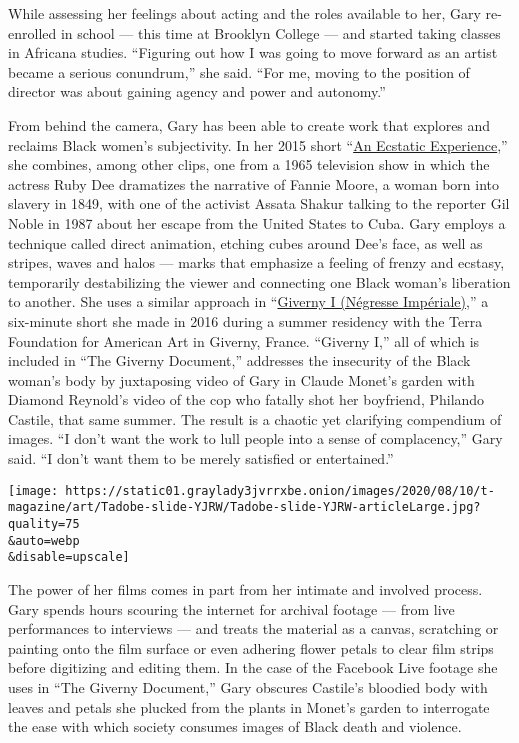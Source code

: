 While assessing her feelings about acting and the roles available to
her, Gary re-enrolled in school --- this time at Brooklyn College ---
and started taking classes in Africana studies. ``Figuring out how I was
going to move forward as an artist became a serious conundrum,'' she
said. ``For me, moving to the position of director was about gaining
agency and power and autonomy.''

From behind the camera, Gary has been able to create work that explores
and reclaims Black women's subjectivity. In her 2015 short
``\href{https://www.jatovia.com/gallery-3\#1}{An Ecstatic Experience},''
she combines, among other clips, one from a 1965 television show in
which the actress Ruby Dee dramatizes the narrative of Fannie Moore, a
woman born into slavery in 1849, with one of the activist Assata Shakur
talking to the reporter Gil Noble in 1987 about her escape from the
United States to Cuba. Gary employs a technique called direct animation,
etching cubes around Dee's face, as well as stripes, waves and halos ---
marks that emphasize a feeling of frenzy and ecstasy, temporarily
destabilizing the viewer and connecting one Black woman's liberation to
another. She uses a similar approach in
``\href{https://www.jatovia.com/giverny-i-negresse-imperiale\#1}{Giverny
I (Négresse Impériale)},'' a six-minute short she made in 2016 during a
summer residency with the Terra Foundation for American Art in Giverny,
France. ``Giverny I,'' all of which is included in ``The Giverny
Document,'' addresses the insecurity of the Black woman's body by
juxtaposing video of Gary in Claude Monet's garden with Diamond
Reynold's video of the cop who fatally shot her boyfriend, Philando
Castile, that same summer. The result is a chaotic yet clarifying
compendium of images. ``I don't want the work to lull people into a
sense of complacency,'' Gary said. ``I don't want them to be merely
satisfied or entertained.''

\texttt{[image: https://static01.graylady3jvrrxbe.onion/images/2020/08/10/t-magazine/art/Tadobe-slide-YJRW/Tadobe-slide-YJRW-articleLarge.jpg?quality=75\\\&auto=webp\\\&disable=upscale]}

The power of her films comes in part from her intimate and involved
process. Gary spends hours scouring the internet for archival footage
--- from live performances to interviews --- and treats the material as
a canvas, scratching or painting onto the film surface or even adhering
flower petals to clear film strips before digitizing and editing them.
In the case of the Facebook Live footage she uses in ``The Giverny
Document,'' Gary obscures Castile's bloodied body with leaves and petals
she plucked from the plants in Monet's garden to interrogate the ease
with which society consumes images of Black death and violence.

